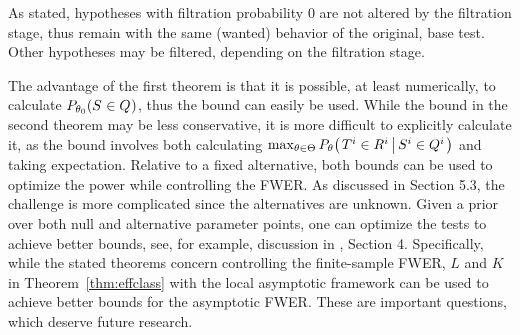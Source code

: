 \documentclass[ejs, twoside]{imsart}
\theoremstyle{plain}
\theoremstyle{remark}
\newcommand{\cond}[2]{\left.{#1}\,\middle|\,{#2}\right.}
\numberwithin{equation}{section}
\numberwithin{table}{section}
\numberwithin{figure}{section}
\let\originalleft\left
\let\originalright\right
\renewcommand{\left}{\mathopen{}\mathclose\bgroup\originalleft}
\renewcommand{\right}{\aftergroup\egroup\originalright}
\begin{document}
As stated, hypotheses with filtration probability \(0\) are not altered by the filtration stage, thus remain with the same (wanted) behavior of the original, base test. Other hypotheses may be filtered, depending on the filtration stage.

The advantage of the first theorem is that it is possible, at least numerically, to calculate \(P_{\theta_0}\left( \nfilevent \right)\), thus the bound can easily be used. While the bound in the second theorem may be less conservative, it is more difficult to explicitly calculate it, as the bound involves both calculating \(\max_{\theta\in\Theta }P_\theta \left(\cond{T^i \in R^i}{S^i \in Q^i}\right)\) and taking expectation. Relative to a fixed alternative, both bounds can be used to optimize the power while controlling the FWER. As discussed in Section 5.3, the challenge is more complicated since the alternatives are unknown. Given a prior over both null and alternative parameter points, one can optimize the tests to achieve better bounds, see, for example, discussion in \citet{djordjilovic_optimal_2020}, Section 4. Specifically, while the stated theorems concern controlling the finite-sample FWER, \(L\) and \(K\) in Theorem~\ref{thm:effclass} with the local asymptotic framework can be used to achieve better bounds for the asymptotic FWER. These are important questions, which deserve future research.
\end{document}
